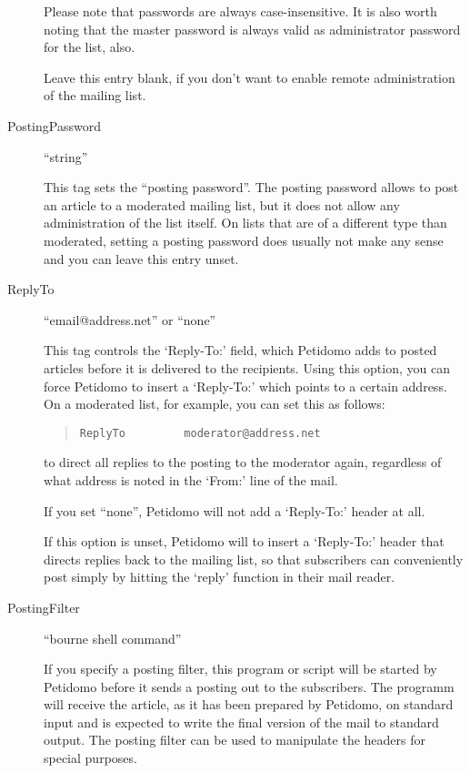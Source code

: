 \documentclass[a4paper,11pt]{scrreprt}
\begin{document}
\begin{description}
Please note that passwords are always case-insensitive. It is also
worth noting that the master password is always valid as administrator
password for the list, also.

Leave this entry blank, if you don't want to enable remote
administration of the mailing list.

\item[PostingPassword] \hfill ``string''
\label{posting password}

This tag sets the ``posting password''. The posting password allows to
post an article to a moderated mailing list, but it does not allow any
administration of the list itself. On lists that are of a different
type than moderated, setting a posting password does usually not make
any sense and you can leave this entry unset.

\item[ReplyTo] \hfill ``email@address.net'' or ``none''

This tag controls the `Reply-To:' field, which Petidomo adds to
posted articles before it is delivered to the recipients. Using this
option, you can force Petidomo to insert a `Reply-To:' which points
to a certain address. On a moderated list, for example, you can set
this as follows:
\begin{quote}
\begin{verbatim}
ReplyTo         moderator@address.net
\end{verbatim}
\end{quote}
to direct all replies to the posting to the moderator again,
regardless of what address is noted in the `From:' line of the mail.

If you set ``none'', Petidomo will not add a `Reply-To:' header at
all.

If this option is unset, Petidomo will to insert a `Reply-To:'
header that directs replies back to the mailing list, so that
subscribers can conveniently post simply by hitting the `reply'
function in their mail reader.

\item[PostingFilter] \hfill ``bourne shell command''

If you specify a posting filter, this program or script will be
started by Petidomo before it sends a posting out to the
subscribers. The programm will receive the article, as it has been
prepared by Petidomo, on standard input and is expected to write the
final version of the mail to standard output. The posting filter can
be used to manipulate the headers for special purposes.


\end{description}
\end{document}
